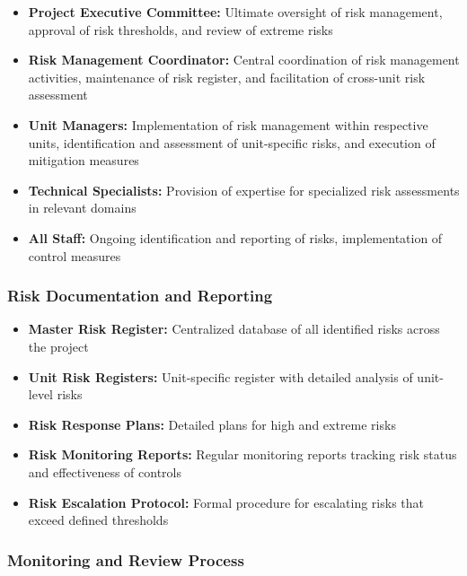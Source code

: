 \begin{itemize}
    \item \textbf{Project Executive Committee:} Ultimate oversight of risk management, approval of risk thresholds, and review of extreme risks
    \item \textbf{Risk Management Coordinator:} Central coordination of risk management activities, maintenance of risk register, and facilitation of cross-unit risk assessment
    \item \textbf{Unit Managers:} Implementation of risk management within respective units, identification and assessment of unit-specific risks, and execution of mitigation measures
    \item \textbf{Technical Specialists:} Provision of expertise for specialized risk assessments in relevant domains
    \item \textbf{All Staff:} Ongoing identification and reporting of risks, implementation of control measures
\end{itemize}

\subsubsection{Risk Documentation and Reporting} \label{sec:risk_reporting}

\begin{itemize}
    \item \textbf{Master Risk Register:} Centralized database of all identified risks across the project
    \item \textbf{Unit Risk Registers:} Unit-specific register with detailed analysis of unit-level risks
    \item \textbf{Risk Response Plans:} Detailed plans for high and extreme risks
    \item \textbf{Risk Monitoring Reports:} Regular monitoring reports tracking risk status and effectiveness of controls
    \item \textbf{Risk Escalation Protocol:} Formal procedure for escalating risks that exceed defined thresholds
\end{itemize}

\subsubsection{Monitoring and Review Process} \label{sec:risk_monitoring}

